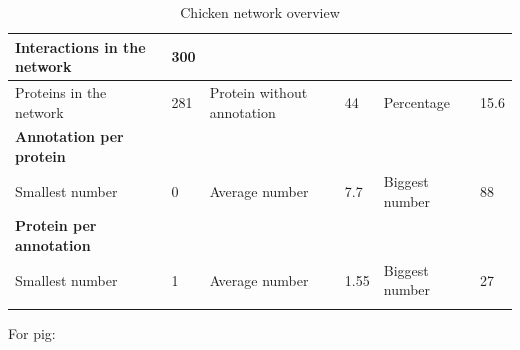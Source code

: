 \documentclass[10pt,a4paper]{article}
\begin{document}
\begin{enumerate}
	\begin{table}[H]
		\centering
		\caption{Chicken network overview}
		\vspace*{1mm}
		\label{chickentableoverview}
		\begin{tabular}{llllll}
			\hline
			\multicolumn{1}{|l|}{Interactions in the network}     & \multicolumn{1}{l|}{300} & \multicolumn{1}{l|}{}                           & \multicolumn{1}{l|}{}    & \multicolumn{1}{l|}{}               & \multicolumn{1}{l|}{}     \\ \hline
			\multicolumn{1}{|l|}{Proteins in the network}         & \multicolumn{1}{l|}{281} & \multicolumn{1}{l|}{Protein without annotation} & \multicolumn{1}{l|}{44}  & \multicolumn{1}{l|}{Percentage}     & \multicolumn{1}{l|}{15.6} \\ \hline
			\multicolumn{1}{|l|}{\textbf{Annotation per protein}} & \multicolumn{1}{l|}{}    & \multicolumn{1}{l|}{}                           & \multicolumn{1}{l|}{}    & \multicolumn{1}{l|}{}               & \multicolumn{1}{l|}{}     \\ \hline
			\multicolumn{1}{|l|}{Smallest number}                 & \multicolumn{1}{l|}{0}   & \multicolumn{1}{l|}{Average number}             & \multicolumn{1}{l|}{7.7} & \multicolumn{1}{l|}{Biggest number} & \multicolumn{1}{l|}{88}   \\ \hline
			\multicolumn{1}{|l|}{\textbf{Protein per annotation}} & \multicolumn{1}{l|}{}    & \multicolumn{1}{l|}{}                           & \multicolumn{1}{l|}{}    & \multicolumn{1}{l|}{}               & \multicolumn{1}{l|}{}     \\ \hline
			\multicolumn{1}{|l|}{Smallest number}                 & \multicolumn{1}{l|}{1}   & \multicolumn{1}{l|}{Average number}             & \multicolumn{1}{l|}{1.55} & \multicolumn{1}{l|}{Biggest number} & \multicolumn{1}{l|}{27}  \\ \hline
			&                          &                                                 &                          &                                     &                          
		\end{tabular}
	\end{table}

	For pig: 
	

\end{enumerate}
\end{document}
